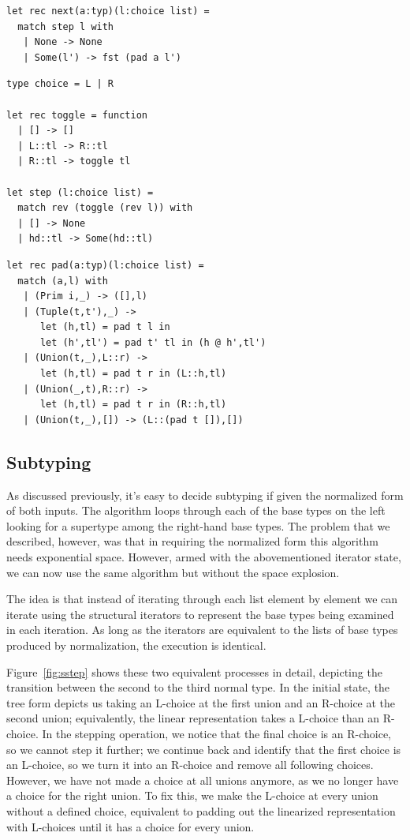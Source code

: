 \documentclass[a4paper,english]{lipics-v2019}
\begin{document}
\begin{lstlisting}
let rec next(a:typ)(l:choice list) = 
  match step l with
   | None -> None
   | Some(l') -> fst (pad a l')
\end{lstlisting}


\begin{lstlisting}
type choice = L | R

let rec toggle = function
  | [] -> []    
  | L::tl -> R::tl
  | R::tl -> toggle tl

let step (l:choice list) =
  match rev (toggle (rev l)) with
  | [] -> None
  | hd::tl -> Some(hd::tl)
\end{lstlisting}


\begin{lstlisting}
let rec pad(a:typ)(l:choice list) = 
  match (a,l) with
   | (Prim i,_) -> ([],l)
   | (Tuple(t,t'),_) -> 
      let (h,tl) = pad t l in
      let (h',tl') = pad t' tl in (h @ h',tl')
   | (Union(t,_),L::r) -> 
      let (h,tl) = pad t r in (L::h,tl)
   | (Union(_,t),R::r) -> 
      let (h,tl) = pad t r in (R::h,tl)
   | (Union(t,_),[]) -> (L::(pad t []),[])
\end{lstlisting}



\subsection{Subtyping}

As discussed previously, it's easy to decide subtyping if given the normalized
form of both inputs. The algorithm loops through each of the base types on the
left looking for a supertype among the right-hand base types. The problem that
we described, however, was that in requiring the normalized form this
algorithm needs exponential space. However, armed with the abovementioned
iterator state, we can now use the same algorithm but without the space
explosion.

The idea is that instead of iterating through each list element by element
we can iterate using the structural iterators to represent the base types
being examined in each iteration. As long as the iterators are equivalent to
the lists of base types produced by normalization, the execution is identical.

Figure~\ref{fig:sstep} shows these two equivalent processes in detail,
depicting the transition between the second to the third normal type. In
the initial state, the tree form depicts us taking an L-choice at the first
union and an R-choice at the second union; equivalently, the linear representation
takes a L-choice than an R-choice. In the stepping operation, we notice that the
final choice is an R-choice, so we cannot step it further; we continue back and
identify that the first choice is an L-choice, so we turn it into an R-choice and
remove all following choices. However, we have not made a choice at all unions
anymore, as we no longer have a choice for the right union. To fix this, we make
the L-choice at every union without a defined choice, equivalent to padding out
the linearized representation with L-choices until it has a choice for every union.
\end{document}
